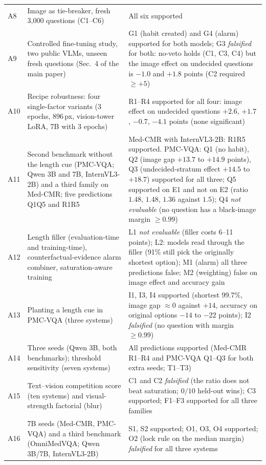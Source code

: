 \begin{table}[h]
{\begin{tabular}{@{}l p{} p{}@{}}
    A8 & Image as tie-breaker, fresh 3{,}000 questions (C1--C6) & All six supported \\
    A9 & Controlled fine-tuning study, two public VLMs, unseen fresh questions (Sec.~4 of the main paper) & G1 (habit created) and G4 (alarm) supported for both models; G3 \emph{falsified} for both: no-veto holds (C1, C3, C4) but the image effect on undecided questions is $-1.0$ and $+1.8$ points (C2 required $\ge+5$) \\
    A10 & Recipe robustness: four single-factor variants (3 epochs, 896\,px, vision-tower LoRA, 7B with 3 epochs) & R1--R4 supported for all four: image effect on undecided questions $+2.6$, $+1.7$, $-0.7$, $-4.1$ points (none significant) \\
    A11 & Second benchmark without the length cue (PMC-VQA; Qwen 3B and 7B, InternVL3-2B) and a third family on Med-CMR; five predictions Q1\textendash{}Q5 and R1\textendash{}R5 & Med-CMR with InternVL3-2B: R1\textendash{}R5 supported. PMC-VQA: Q1 (no habit), Q2 (image gap $+13.7$ to $+14.9$ points), Q3 (undecided-stratum effect $+14.5$ to $+18.7$) supported for all three; Q5 supported on E1 and not on E2 (ratio $1.48$, $1.48$, $1.36$ against $1.5$); Q4 \emph{not evaluable} (no question has a black-image margin $\ge0.99$) \\
    A12 & Length filler (evaluation-time and training-time), counterfactual-evidence alarm combiner, saturation-aware training & L1 \emph{not evaluable} (filler costs 6--11 points); L2: models read through the filler (91\% still pick the originally shortest option); M1 (alarm) all three predictions false; M2 (weighting) false on image effect and accuracy gain \\
    A13 & Planting a length cue in PMC-VQA (three systems) & I1, I3, I4 supported (shortest 99.7\%, image gap $\approx0$ against $+14$, accuracy on original options $-14$ to $-22$ points); I2 \emph{falsified} (no question with margin $\ge0.99$) \\
    A14 & Three seeds (Qwen 3B, both benchmarks); threshold sensitivity (seven systems) & All predictions supported (Med-CMR R1--R4 and PMC-VQA Q1--Q3 for both extra seeds; T1--T3) \\
    A15 & Text--vision competition score (ten systems) and visual-strength factorial (blur) & C1 and C2 \emph{falsified} (the ratio does not beat saturation; $0/10$ held-out wins); C3 supported; F1--F3 supported for all three families \\
    A16 & 7B seeds (Med-CMR, PMC-VQA) and a third benchmark (OmniMedVQA; Qwen 3B/7B, InternVL3-2B) & S1, S2 supported; O1, O3, O4 supported; O2 (lock rule on the median margin) \emph{falsified} for all three systems \\

\end{tabular}}
\end{table}
